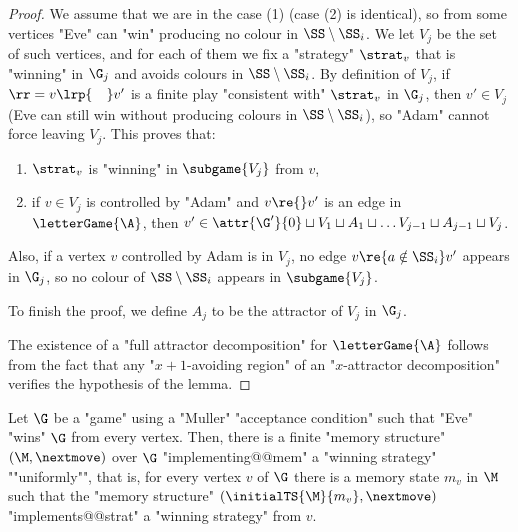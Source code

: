 \documentclass{theoretics}
\begin{document}
\begin{proof}
	We assume that we are in the case (1) (case (2) is identical), so from some vertices "Eve" can "win" producing no colour in $\SS\setminus \SS_i$. We let $V_j$ be the set of such vertices, and for each of them we fix a "strategy" $\strat_{v}$ that is "winning" in $\G_j$ and avoids colours in $\SS\setminus \SS_i$.  By definition of $V_j$, if $\rr = v\lrp{\phantom{w.}} v'$ is a finite play "consistent with" $\strat_{v}$ in $\G_j$, then $v'\in V_j$ (Eve can still win without producing colours in $\SS\setminus \SS_i$), so "Adam" cannot force leaving $V_j$. This proves that:
	\begin{enumerate}
		\item $\strat_v$ is "winning" in $\subgame{V_j}$ from $v$,
		\item if $v\in V_j$ is controlled by "Adam" and $v\re{}v'$ is an edge in $\letterGame{\A}$, then $v'\in \attr{\G'}{0} \sqcup V_1 \sqcup A_1 \sqcup \dots  V_{j-1} \sqcup A_{j-1} \sqcup V_j$.
	\end{enumerate}	
	Also, if a vertex $v$ controlled by Adam is in $V_j$, no edge $v\re{a\notin \SS_i}v'$ appears in $\G_j$, so no colour of $\SS\setminus \SS_i$ appears in $\subgame{V_j}$.
	
	To finish the proof, we define $A_j$ to be the attractor of $V_j$ in $\G_j$.
 
	The existence of a  "full attractor decomposition" for $\letterGame{\A}$ follows from the fact that any "$x+1$-avoiding region" of an "$x$-attractor decomposition" verifies the hypothesis of the lemma.
\end{proof}


\begin{lemma}\label{lemma-ZT:uniform-memory-strat}
	Let $\G$ be a "game" using a "Muller" "acceptance condition" such that "Eve" "wins" $\G$ from every vertex. Then, there is a finite "memory structure"  $(\M,\nextmove)$ over $\G$ "implementing@@mem" a "winning strategy" ""uniformly"", that is, for every vertex $v$ of $\G$ there is a memory state $m_v$ in $\M$ such that the "memory structure" $(\initialTS{\M}{m_v},\nextmove)$ "implements@@strat" a "winning strategy" from $v$.
\end{lemma}
\end{document}
